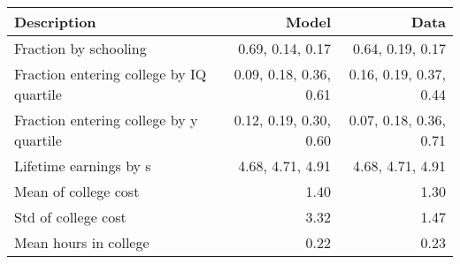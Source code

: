\begin{tabular}{lrr}
\hline
Description & Model  & Data  \\
\hline
Fraction by schooling & 0.69, 0.14, 0.17  & 0.64, 0.19, 0.17  \\
Fraction entering college by IQ quartile & 0.09, 0.18, 0.36, 0.61  & 0.16, 0.19, 0.37, 0.44  \\
Fraction entering college by y quartile & 0.12, 0.19, 0.30, 0.60  & 0.07, 0.18, 0.36, 0.71  \\
Lifetime earnings by s & 4.68, 4.71, 4.91  & 4.68, 4.71, 4.91  \\
Mean of college cost & 1.40  & 1.30  \\
Std of college cost & 3.32  & 1.47  \\
Mean hours in college & 0.22  & 0.23  \\
\hline
\end{tabular}%
